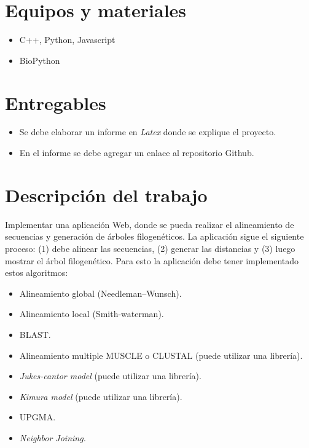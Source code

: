 \documentclass{article}
\begin{document}
\section{Equipos y materiales}
\begin{itemize}
	\item C++, Python, Javascript
	\item BioPython
\end{itemize}

\section{Entregables}
\begin{itemize}
	\item Se debe elaborar un informe en \textit{Latex} donde se explique el proyecto.
	\item En el informe se debe agregar un enlace al repositorio Github.
\end{itemize}




\clearpage





\section{Descripción del trabajo}

Implementar una aplicación Web, donde se pueda realizar el alineamiento de secuencias y generación de árboles filogenéticos. La aplicación sigue el siguiente proceso: (1) debe alinear las secuencias, (2) generar las distancias y (3) luego mostrar el árbol filogenético. Para esto la aplicación debe tener implementado estos algoritmos:
	\begin{itemize}
		\item Alineamiento global (Needleman–Wunsch).
		\item Alineamiento local (Smith-waterman).
		\item BLAST.
		\item Alineamiento multiple MUSCLE o CLUSTAL (puede utilizar una librería).		
		\item \textit{Jukes-cantor model} (puede utilizar una librería).
		\item \textit{Kimura model} (puede utilizar una librería).
		\item UPGMA.
		\item \textit{Neighbor Joining.}
	\end{itemize}
\end{document}
